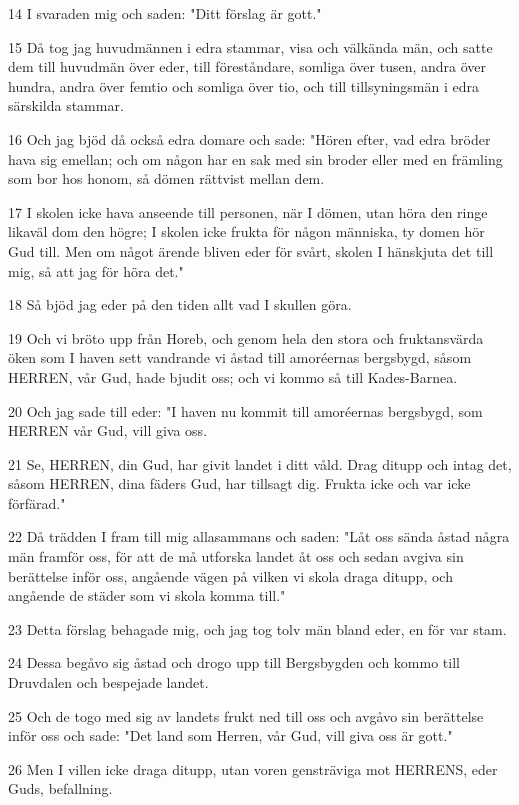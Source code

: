 \par 14 I svaraden mig och saden: "Ditt förslag är gott."
\par 15 Då tog jag huvudmännen i edra stammar, visa och välkända män, och satte dem till huvudmän över eder, till föreståndare, somliga över tusen, andra över hundra, andra över femtio och somliga över tio, och till tillsyningsmän i edra särskilda stammar.
\par 16 Och jag bjöd då också edra domare och sade: "Hören efter, vad edra bröder hava sig emellan; och om någon har en sak med sin broder eller med en främling som bor hos honom, så dömen rättvist mellan dem.
\par 17 I skolen icke hava anseende till personen, när I dömen, utan höra den ringe likaväl dom den högre; I skolen icke frukta för någon människa, ty domen hör Gud till. Men om något ärende bliven eder för svårt, skolen I hänskjuta det till mig, så att jag för höra det."
\par 18 Så bjöd jag eder på den tiden allt vad I skullen göra.
\par 19 Och vi bröto upp från Horeb, och genom hela den stora och fruktansvärda öken som I haven sett vandrande vi åstad till amoréernas bergsbygd, såsom HERREN, vår Gud, hade bjudit oss; och vi kommo så till Kades-Barnea.
\par 20 Och jag sade till eder: "I haven nu kommit till amoréernas bergsbygd, som HERREN vår Gud, vill giva oss.
\par 21 Se, HERREN, din Gud, har givit landet i ditt våld. Drag ditupp och intag det, såsom HERREN, dina fäders Gud, har tillsagt dig. Frukta icke och var icke förfärad."
\par 22 Då trädden I fram till mig allasammans och saden: "Låt oss sända åstad några män framför oss, för att de må utforska landet åt oss och sedan avgiva sin berättelse inför oss, angående vägen på vilken vi skola draga ditupp, och angående de städer som vi skola komma till."
\par 23 Detta förslag behagade mig, och jag tog tolv män bland eder, en för var stam.
\par 24 Dessa begåvo sig åstad och drogo upp till Bergsbygden och kommo till Druvdalen och bespejade landet.
\par 25 Och de togo med sig av landets frukt ned till oss och avgåvo sin berättelse inför oss och sade: "Det land som Herren, vår Gud, vill giva oss är gott."
\par 26 Men I villen icke draga ditupp, utan voren gensträviga mot HERRENS, eder Guds, befallning.
